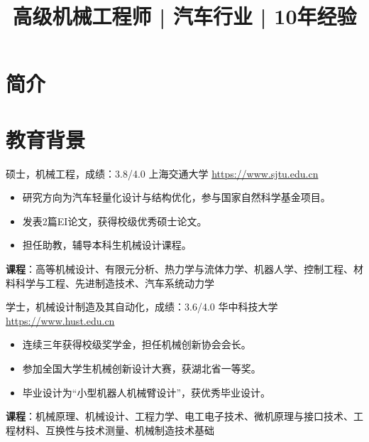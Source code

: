 \documentclass[a4paper, serif, 10pt]{moderncv}
\title{高级机械工程师 | 汽车行业 | 10年经验}
\begin{document}
\maketitle

\section{简介}

\section{教育背景}

        {硕士，机械工程，成绩：3.8/4.0}
        {上海交通大学}
        {\url{https://www.sjtu.edu.cn}}
        {}
        {\begin{itemize}
\item 研究方向为汽车轻量化设计与结构优化，参与国家自然科学基金项目。
\item 发表2篇EI论文，获得校级优秀硕士论文。
\item 担任助教，辅导本科生机械设计课程。
\end{itemize}
\textbf{课程}：高等机械设计、有限元分析、热力学与流体力学、机器人学、控制工程、材料科学与工程、先进制造技术、汽车系统动力学}

        {学士，机械设计制造及其自动化，成绩：3.6/4.0}
        {华中科技大学}
        {\url{https://www.hust.edu.cn}}
        {}
        {\begin{itemize}
\item 连续三年获得校级奖学金，担任机械创新协会会长。
\item 参加全国大学生机械创新设计大赛，获湖北省一等奖。
\item 毕业设计为“小型机器人机械臂设计”，获优秀毕业设计。
\end{itemize}
\textbf{课程}：机械原理、机械设计、工程力学、电工电子技术、微机原理与接口技术、工程材料、互换性与技术测量、机械制造技术基础}
\end{document}
